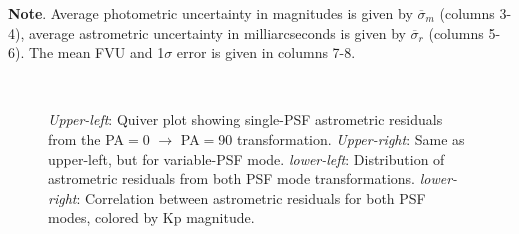 \documentclass[]{spie}  %
\begin{document}
\begin{table}[!h]
\begin{center}
\begin{tabular}{lccccccc}
\end{tabular}
\end{center}
{\raggedright \footnotesize{\textbf{Note}. Average photometric uncertainty in magnitudes is given by $\overline{\sigma}_{m}$ (columns 3-4), average astrometric uncertainty in milliarcseconds is given by $\overline{\sigma}_{r}$ (columns 5-6). The mean FVU and 1$\sigma$ error is given in columns 7-8.}\par}
\label{tab:PhotAstromFVU-results}
\end{table}

\begin{figure}[!h]
  \centering
  \\
  \hspace{-1cm}
  \caption{\textit{Upper-left}: Quiver plot showing single-PSF astrometric residuals from the PA$=$0 $\rightarrow$ PA$=$90 transformation. \textit{Upper-right}: Same as upper-left, but for variable-PSF mode. \textit{lower-left}: Distribution of astrometric residuals from both PSF mode transformations. \textit{lower-right}: Correlation between astrometric residuals for both PSF modes, colored by Kp magnitude.} \label{fig:m53_PA_compare}
\end{figure}
\end{document}
